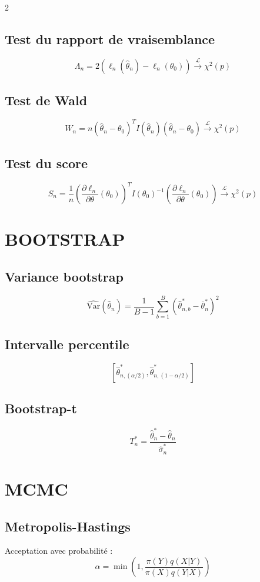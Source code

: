 \documentclass[10pt,a4paper]{article}
\begin{document}
\begin{multicols}{2}
\subsection*{Test du rapport de vraisemblance}
\[
\Lambda_n = 2(\ell_n(\hat{\theta}_n) - \ell_n(\theta_0)) \xrightarrow{\mathcal{L}} \chi^2(p)
\]

\subsection*{Test de Wald}
\[
W_n = n(\hat{\theta}_n - \theta_0)^T I(\hat{\theta}_n) (\hat{\theta}_n - \theta_0) \xrightarrow{\mathcal{L}} \chi^2(p)
\]

\subsection*{Test du score}
\[
S_n = \frac{1}{n} \left(\frac{\partial \ell_n}{\partial \theta}(\theta_0)\right)^T I(\theta_0)^{-1} \left(\frac{\partial \ell_n}{\partial \theta}(\theta_0)\right) \xrightarrow{\mathcal{L}} \chi^2(p)
\]

\section*{BOOTSTRAP}

\subsection*{Variance bootstrap}
\[
\widehat{\text{Var}}(\hat{\theta}_n) = \frac{1}{B-1} \sum_{b=1}^B (\hat{\theta}_{n,b}^* - \bar{\theta}_n^*)^2
\]

\subsection*{Intervalle percentile}
\[
[\hat{\theta}_{n,(\alpha/2)}^*, \hat{\theta}_{n,(1-\alpha/2)}^*]
\]

\subsection*{Bootstrap-t}
\[
T_n^* = \frac{\hat{\theta}_n^* - \hat{\theta}_n}{\hat{\sigma}_n^*}
\]

\section*{MCMC}

\subsection*{Metropolis-Hastings}
Acceptation avec probabilité :
\[
\alpha = \min\left(1, \frac{\pi(Y) q(X|Y)}{\pi(X) q(Y|X)}\right)
\]


\end{multicols}
\end{document}
